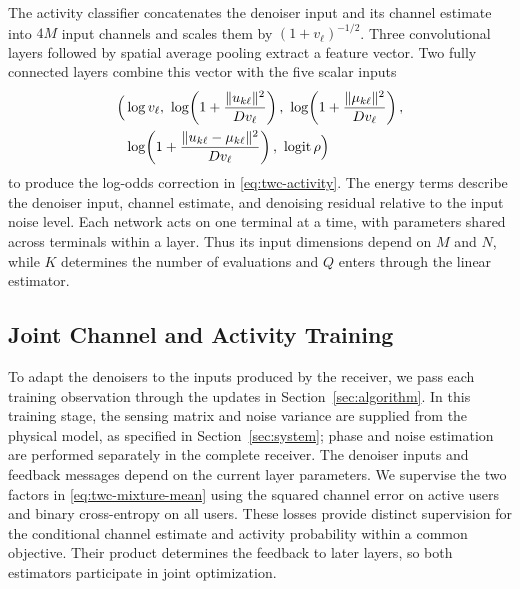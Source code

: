 The activity classifier concatenates the denoiser input and its
channel estimate into $4M$ input channels and scales them by
$(1+v_\ell)^{-1/2}$. Three convolutional layers followed by spatial
average pooling extract a feature vector. Two fully connected layers
combine this vector with the five scalar inputs
\begin{equation}
 \begin{aligned}
 \Big(&\log v_\ell,\
 \log\!\left(1+\frac{\|u_{k\ell}\|^2}{Dv_\ell}\right),\
 \log\!\left(1+\frac{\|\mu_{k\ell}\|^2}{Dv_\ell}\right),\\
 &\log\!\left(1+\frac{\|u_{k\ell}-\mu_{k\ell}\|^2}{Dv_\ell}\right),\
 \operatorname{logit}\rho\Big)
 \end{aligned}
 \label{eq:twc-classifier-features}
\end{equation}
to produce the log-odds correction in \eqref{eq:twc-activity}.
The energy terms describe the denoiser input, channel estimate, and denoising
residual relative to the input noise level. Each network acts on
one terminal at a time, with parameters shared across terminals
within a layer. Thus its input dimensions depend on $M$ and $N$,
while $K$ determines the number of evaluations and $Q$ enters through
the linear estimator.

\subsection{Joint Channel and Activity Training}

To adapt the denoisers to the inputs produced by the receiver, we
pass each training observation through the updates in
Section~\ref{sec:algorithm}. In this training stage, the sensing matrix
and noise variance are supplied from the physical model, as specified
in Section~\ref{sec:system}; phase and noise estimation are performed
separately in the complete receiver.
The denoiser inputs and feedback messages depend on the current layer
parameters. We supervise the two factors in
\eqref{eq:twc-mixture-mean} using the squared channel error on active
users and binary cross-entropy on all users. These losses provide
distinct supervision for the conditional channel estimate and activity
probability within a common objective. Their
product determines the feedback to later layers, so both estimators
participate in joint optimization.

